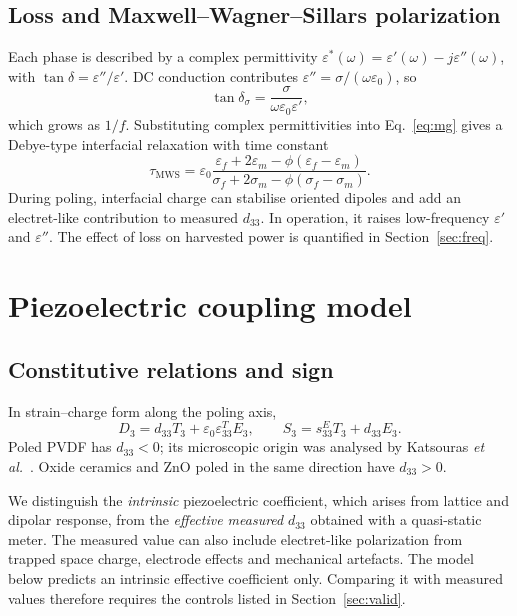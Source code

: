 \documentclass[11pt,a4paper]{article}
\newcommand{\dt}{d_{33}}
\begin{document}
\subsection{Loss and Maxwell--Wagner--Sillars polarization}
Each phase is described by a complex permittivity $\varepsilon^*(\omega)=\varepsilon'(\omega)-j\varepsilon''(\omega)$, with $\tan\delta=\varepsilon''/\varepsilon'$. DC conduction contributes $\varepsilon''=\sigma/(\omega\varepsilon_0)$, so
\begin{equation}
\tan\delta_\sigma=\frac{\sigma}{\omega\varepsilon_0\varepsilon'},
\label{eq:tand}
\end{equation}
which grows as $1/f$. Substituting complex permittivities into Eq.~\eqref{eq:mg} gives a Debye-type interfacial relaxation with time constant
\begin{equation}
\tau_{\mathrm{MWS}}=\varepsilon_0\frac{\varepsilon_f+2\varepsilon_m-\phi(\varepsilon_f-\varepsilon_m)}{\sigma_f+2\sigma_m-\phi(\sigma_f-\sigma_m)}.
\end{equation}
During poling, interfacial charge can stabilise oriented dipoles and add an electret-like contribution to measured $\dt$. In operation, it raises low-frequency $\varepsilon'$ and $\varepsilon''$. The effect of loss on harvested power is quantified in Section~\ref{sec:freq}.

\section{Piezoelectric coupling model}

\subsection{Constitutive relations and sign}
In strain--charge form along the poling axis,
\begin{equation}
D_3=\dt T_3+\varepsilon_0\varepsilon^T_{33}E_3,\qquad S_3=s^E_{33}T_3+\dt E_3 .
\end{equation}
Poled PVDF has $\dt<0$; its microscopic origin was analysed by Katsouras \emph{et al.}~\cite{Katsouras2016}. Oxide ceramics and ZnO poled in the same direction have $\dt>0$.

We distinguish the \emph{intrinsic} piezoelectric coefficient, which arises from lattice and dipolar response, from the \emph{effective measured} $\dt$ obtained with a quasi-static meter. The measured value can also include electret-like polarization from trapped space charge, electrode effects and mechanical artefacts. The model below predicts an intrinsic effective coefficient only. Comparing it with measured values therefore requires the controls listed in Section~\ref{sec:valid}.
\end{document}
